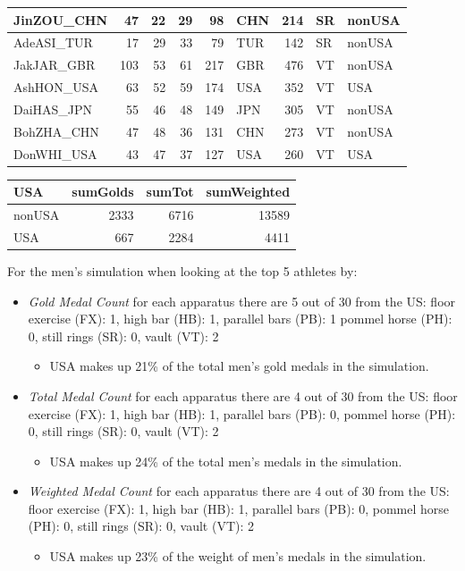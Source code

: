 \documentclass[
  letterpaper,
  DIV=11,
  numbers=noendperiod]{scrartcl}
\providecommand{\tightlist}{%
  \setlength{\itemsep}{0pt}\setlength{\parskip}{0pt}}\usepackage{longtable,booktabs,array}
\begin{document}
\begin{tabular}{l|r|r|r|r|l|r|l|l}
\hline
JinZOU\_CHN & 47 & 22 & 29 & 98 & CHN & 214 & SR & nonUSA\\
\hline
AdeASI\_TUR & 17 & 29 & 33 & 79 & TUR & 142 & SR & nonUSA\\
\hline
JakJAR\_GBR & 103 & 53 & 61 & 217 & GBR & 476 & VT & nonUSA\\
\hline
AshHON\_USA & 63 & 52 & 59 & 174 & USA & 352 & VT & USA\\
\hline
DaiHAS\_JPN & 55 & 46 & 48 & 149 & JPN & 305 & VT & nonUSA\\
\hline
BohZHA\_CHN & 47 & 48 & 36 & 131 & CHN & 273 & VT & nonUSA\\
\hline
DonWHI\_USA & 43 & 47 & 37 & 127 & USA & 260 & VT & USA\\
\hline
\end{tabular}

\begin{tabular}{l|r|r|r}
\hline
USA & sumGolds & sumTot & sumWeighted\\
\hline
nonUSA & 2333 & 6716 & 13589\\
\hline
USA & 667 & 2284 & 4411\\
\hline
\end{tabular}

For the men's simulation when looking at the top 5 athletes by:

\begin{itemize}
\item
  \emph{Gold Medal Count} for each apparatus there are 5 out of 30 from
  the US: floor exercise (FX): 1, high bar (HB): 1, parallel bars (PB):
  1 pommel horse (PH): 0, still rings (SR): 0, vault (VT): 2

  \begin{itemize}
  \tightlist
  \item
    USA makes up 21\% of the total men's gold medals in the simulation.
  \end{itemize}
\item
  \emph{Total Medal Count} for each apparatus there are 4 out of 30 from
  the US: floor exercise (FX): 1, high bar (HB): 1, parallel bars (PB):
  0, pommel horse (PH): 0, still rings (SR): 0, vault (VT): 2

  \begin{itemize}
  \tightlist
  \item
    USA makes up 24\% of the total men's medals in the simulation.
  \end{itemize}
\item
  \emph{Weighted Medal Count} for each apparatus there are 4 out of 30
  from the US: floor exercise (FX): 1, high bar (HB): 1, parallel bars
  (PB): 0, pommel horse (PH): 0, still rings (SR): 0, vault (VT): 2

  \begin{itemize}
  \tightlist
  \item
    USA makes up 23\% of the weight of men's medals in the simulation.
  \end{itemize}
\end{itemize}
\end{document}
